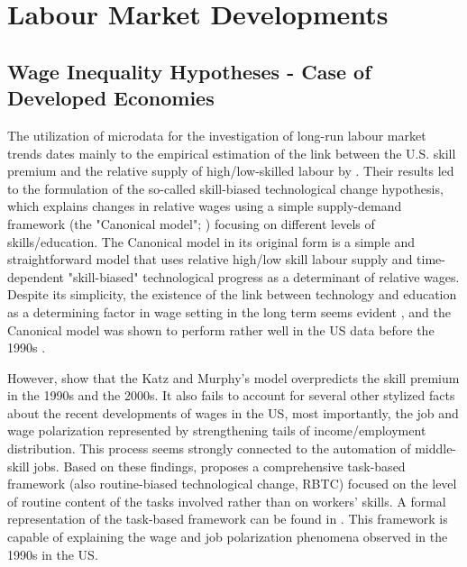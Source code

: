 \documentclass[11pt]{article}
\begin{document}
\section{Labour Market Developments}
\subsection{Wage Inequality Hypotheses - Case of Developed Economies}

The utilization of microdata for the investigation of long-run labour market trends dates mainly to the empirical estimation of the link between the U.S. skill premium and the relative supply of high/low-skilled labour by \citet{katz1992changes}. Their results led to the formulation of the so-called skill-biased technological change hypothesis, which explains changes in relative wages using a simple supply-demand framework (the "Canonical model"; \citealt{acemoglu2012does}) focusing on different levels of skills/education. The Canonical model in its original form is a simple and straightforward model that uses relative high/low skill labour supply and time-dependent "skill-biased" technological progress as a determinant of relative wages. Despite its simplicity, the existence of the link between technology and education as a determining factor in wage setting in the long term seems evident \citep{piketty2018capital}, and the Canonical model was shown to perform rather well in the US data before the 1990s \citep{katz1992changes}.

However, \citet{acemoglu2011skills} show that the Katz and Murphy's model overpredicts the skill premium in the 1990s and the 2000s. It also fails to account for several other stylized facts about the recent developments of wages in the US, most importantly, the job and wage polarization represented by strengthening tails of income/employment distribution. This process seems strongly connected to the automation of middle-skill jobs. Based on these findings, \citet{acemoglu2012does} proposes a comprehensive task-based framework (also routine-biased technological change, RBTC) focused on the level of routine content of the tasks involved rather than on workers' skills. A formal representation of the task-based framework can be found in \citet{acemoglu2011skills}. This framework is capable of explaining the wage and job polarization phenomena observed in the 1990s in the US.
\end{document}
